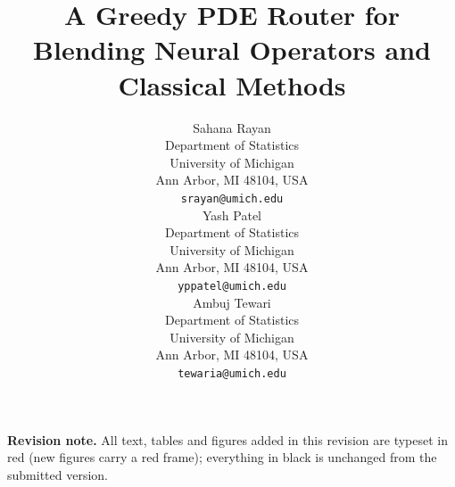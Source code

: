 \documentclass{article}
\title{A Greedy PDE Router for Blending Neural Operators and Classical Methods}
\author{Sahana Rayan \\
Department of Statistics\\
University of Michigan\\
Ann Arbor, MI 48104, USA \\
\texttt{srayan@umich.edu} \\
\And
Yash Patel \\
Department of Statistics\\
University of Michigan\\
Ann Arbor, MI 48104, USA \\
\texttt{yppatel@umich.edu} \\
\And
Ambuj Tewari \\
Department of Statistics\\
University of Michigan\\
Ann Arbor, MI 48104, USA \\
\texttt{tewaria@umich.edu} \\
}
\newcommand{\edit}[1]{{\color{red}#1}}
\newcommand{\ambuj}[1]{\textcolor{red}{AT: #1}}
\begin{document}
\maketitle

\edit{\noindent\textbf{Revision note.} All text, tables and figures added in this revision are typeset in red (new figures carry a red frame); everything in black is unchanged from the submitted version.}


\begin{abstract}

\end{abstract}
\end{document}
